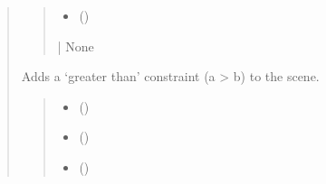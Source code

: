 \documentclass[letterpaper,10pt,english]{sphinxmanual}
\begin{document}
\begin{quote}
\begin{fulllineitems}
\begin{fulllineitems}
\begin{quote}
\begin{description}
\begin{itemize}
\item {} 
\sphinxAtStartPar
{} (\sphinxstyleliteralemphasis{\sphinxupquote{ | }})

\end{itemize}

\sphinxAtStartPar
{} | None

\end{description}\end{quote}

\end{fulllineitems}


\begin{fulllineitems}
\label{\detokenize{pygeox:pygeox.constraint.ConstraintNamespace.gt}}
\pysigstartsignatures
\pysiglinewithargsret
{}
{\sphinxparamcomma {}\sphinxparamcomma {}}
{}
\pysigstopsignatures
\sphinxAtStartPar
Adds a ‘greater than’ constraint (a \textgreater{} b) to the scene.
\begin{quote}\begin{description}
\begin{itemize}
\item {} 
\sphinxAtStartPar
{} (\sphinxstyleliteralemphasis{\sphinxupquote{ | }}\sphinxstyleliteralemphasis{\sphinxupquote{ | }})

\item {} 
\sphinxAtStartPar
{} (\sphinxstyleliteralemphasis{\sphinxupquote{ | }}\sphinxstyleliteralemphasis{\sphinxupquote{ | }})

\item {} 
\sphinxAtStartPar
{} (\sphinxstyleliteralemphasis{\sphinxupquote{ | }})


\end{itemize}
\end{description}
\end{quote}
\end{fulllineitems}
\end{fulllineitems}
\end{quote}
\end{document}
